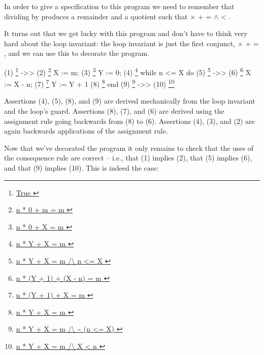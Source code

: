 \documentclass[12pt]{report}
\begin{document}
 In order to give a specification to this program we need to
    remember that dividing  by  produces a remainder  and a
    quotient  such that  \ensuremath{\times}  +  =  \ensuremath{\land}  < .


    It turns out that we get lucky with this program and don't have to
    think very hard about the loop invariant: the loop invariant is just
    the first conjunct,  \ensuremath{\times}  +  = , and we can use this to
    decorate the program.


      (1)  \footnote{\url{ True }} ->>
      (2)  \footnote{\url{ n * 0 + m = m }}
             X := m;
      (3)                     \footnote{\url{ n * 0 + X = m }}
             Y := 0;
      (4)                     \footnote{\url{ n * Y + X = m }}
             while n <= X do
      (5)                     \footnote{\url{ n * Y + X = m /\ n <= X }} ->>
      (6)                     \footnote{\url{ n * (Y + 1) + (X - n) = m }}
               X := X - n;
      (7)                     \footnote{\url{ n * (Y + 1) + X = m }}
               Y := Y + 1
      (8)                     \footnote{\url{ n * Y + X = m }}
             end
      (9)  \footnote{\url{ n * Y + X = m /\ ~ (n <= X) }} ->>
     (10)  \footnote{\url{ n * Y + X = m /\ X < n }}


    Assertions (4), (5), (8), and (9) are derived mechanically from
    the loop invariant and the loop's guard.  Assertions (8), (7), and (6)
    are derived using the assignment rule going backwards from (8)
    to (6).  Assertions (4), (3), and (2) are again backwards
    applications of the assignment rule.


    Now that we've decorated the program it only remains to check that
    the uses of the consequence rule are correct -- i.e., that (1)
    implies (2), that (5) implies (6), and that (9) implies (10). This
    is indeed the case:
\end{document}
